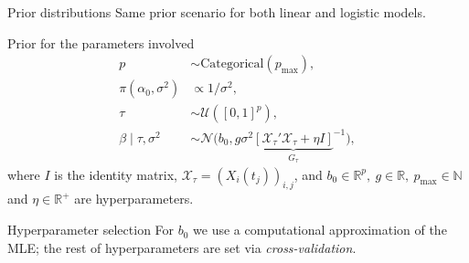 \documentclass[10pt, english, professionalfonts]{beamer}
\newcommand{\N}{\mathbb{N}}
\newcommand{\R}{\mathbb{R}}
\newcommand{\Hcal}{\ensuremath\mathcal{H}}
\begin{document}
%
%
%
%
%
%

\begin{frame}{Prior distributions}
  Same prior scenario for both linear and logistic models.
  \begin{block}{Prior for the parameters involved}
    \vspace{-1em}
  \begin{align*}
    p &\sim \text{Categorical}(p_{\text{max}}),\\
  \pi(\alpha_0, \sigma^2)              & \propto 1/\sigma^2,                                                     \\
  \tau                     & \sim \mathcal U([0, 1]^p),                                              \\
  \beta\mid \tau, \sigma^2 & \sim \mathcal N\big(b_0, g\sigma^2{\underbrace{\left[\mathcal X_\tau' \mathcal X_\tau + \eta I\right]}_{G_\tau}}^{-1}\big),
\end{align*}
where \(I\) is the identity matrix, \(\mathcal X_\tau = (X_i(t_j))_{i,j}\), and \(b_0\in \R^p, \ g \in \R, \ p_{\text{max}}\in \N\) and \(\eta \in \R^+\) are hyperparameters.
\end{block}


\vspace{1em}
\begin{alertblock}{Hyperparameter selection}
  \vspace{0.1em}
  For \(b_0\) we use a computational approximation of the MLE; the rest of hyperparameters are set via \textit{cross-validation}.
\end{alertblock}
\end{frame}
\end{document}
